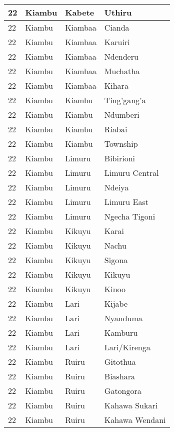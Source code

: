 \begin{table}[!ht]
\begin{tabular}{|l|l|l|l|}
        22 & Kiambu & Kabete & Uthiru \\ \hline
        22 & Kiambu & Kiambaa & Cianda \\ \hline
        22 & Kiambu & Kiambaa & Karuiri \\ \hline
        22 & Kiambu & Kiambaa & Ndenderu \\ \hline
        22 & Kiambu & Kiambaa & Muchatha \\ \hline
        22 & Kiambu & Kiambaa & Kihara \\ \hline
        22 & Kiambu & Kiambu & Ting’gang’a \\ \hline
        22 & Kiambu & Kiambu & Ndumberi \\ \hline
        22 & Kiambu & Kiambu & Riabai \\ \hline
        22 & Kiambu & Kiambu & Township \\ \hline
        22 & Kiambu & Limuru & Bibirioni \\ \hline
        22 & Kiambu & Limuru & Limuru Central \\ \hline
        22 & Kiambu & Limuru & Ndeiya \\ \hline
        22 & Kiambu & Limuru & Limuru East \\ \hline
        22 & Kiambu & Limuru & Ngecha Tigoni \\ \hline
        22 & Kiambu & Kikuyu & Karai \\ \hline
        22 & Kiambu & Kikuyu & Nachu \\ \hline
        22 & Kiambu & Kikuyu & Sigona \\ \hline
        22 & Kiambu & Kikuyu & Kikuyu \\ \hline
        22 & Kiambu & Kikuyu & Kinoo \\ \hline
        22 & Kiambu & Lari & Kijabe \\ \hline
        22 & Kiambu & Lari & Nyanduma \\ \hline
        22 & Kiambu & Lari & Kamburu \\ \hline
        22 & Kiambu & Lari & Lari/Kirenga \\ \hline
        22 & Kiambu & Ruiru & Gitothua \\ \hline
        22 & Kiambu & Ruiru & Biashara \\ \hline
        22 & Kiambu & Ruiru & Gatongora \\ \hline
        22 & Kiambu & Ruiru & Kahawa Sukari \\ \hline
        22 & Kiambu & Ruiru & Kahawa Wendani \\ \hline

\end{tabular}
\end{table}
